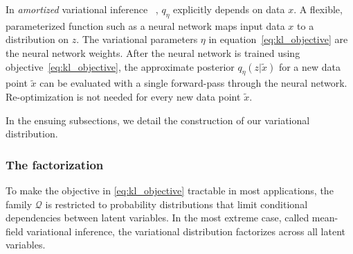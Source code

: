 In {\itshape amortized} variational inference
~\cite{kingma2013autoencoding, rezende2014stochastic}, $q_\eta$ explicitly depends on data $x$. A flexible, parameterized function such as a neural network maps input data $x$ to
a distribution on $z$. 
The variational parameters $\eta$ in equation~\eqref{eq:kl_objective} 
are the neural network weights. 
After the neural network is trained using 
objective~\eqref{eq:kl_objective}, the 
approximate posterior $q_\eta(z | \tilde x)$ for a new data point 
$\tilde x$ can be evaluated with a single forward-pass through the neural network. 
Re-optimization is not needed for every new data point $\tilde x$. 

In the ensuing subsections, we detail the construction of our variational distribution. 

\subsubsection{The factorization}
\label{sec:factorization}
To make the objective in \eqref{eq:kl_objective} tractable in most 
applications, the family $\mathcal{Q}$ is restricted to probability distributions 
that limit conditional dependencies between latent variables. In the most extreme case, called mean-field variational inference, the variational distribution factorizes across all latent variables. 

